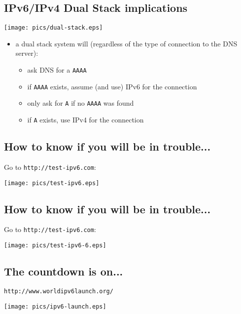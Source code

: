\documentclass[xga]{xdvislides}
\begin{document}
\subsection{IPv6/IPv4 Dual Stack implications}
\begin{center}
	\texttt{[image: pics/dual-stack.eps]}
\end{center}
\begin{itemize}
	\item a dual stack system will (regardless of the type of connection to
		the DNS server):
		\begin{itemize}
			\item ask DNS for a \verb+AAAA+
			\item if \verb+AAAA+ exists, assume (and use) IPv6 for the connection
			\item only ask for \verb+A+ if no \verb+AAAA+ was found
			\item if \verb+A+ exists, use IPv4 for the connection
		\end{itemize}
\end{itemize}

\subsection{How to know if you will be in trouble...}
Go to \verb+http://test-ipv6.com+:
\begin{center}
	\texttt{[image: pics/test-ipv6.eps]}
\end{center}

\subsection{How to know if you will be in trouble...}
Go to \verb+http://test-ipv6.com+:
\begin{center}
	\texttt{[image: pics/test-ipv6-6.eps]}
\end{center}

\subsection{The countdown is on...}
\verb+http://www.worldipv6launch.org/+ \\

\begin{center}
	\texttt{[image: pics/ipv6-launch.eps]}
\end{center}
\end{document}
